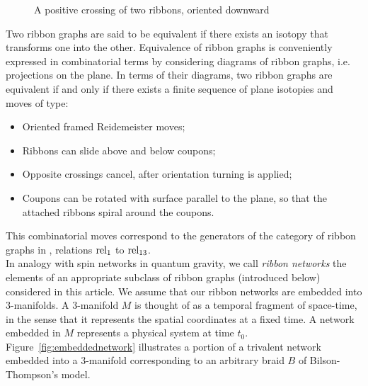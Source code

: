 \documentclass[aps,nofootinbib,amsfonts,superscriptaddress]{revtex4}
\begin{document}
\begin{figure}
    \centering
    \caption{A positive crossing of two ribbons, oriented downward}
    \label{fig:crossing}
\end{figure}
Two ribbon graphs are said to be equivalent if there exists an isotopy that transforms one into the other. Equivalence of ribbon graphs is conveniently expressed in combinatorial terms by considering diagrams of ribbon graphs, i.e. projections on the plane. In terms of their diagrams, two ribbon graphs are equivalent if and only if there exists a finite sequence of plane isotopies and moves of type:
\begin{itemize}
    \item 
    Oriented framed Reidemeister moves;
    \item 
    Ribbons can slide above and below coupons;
    \item
    Opposite crossings cancel, after orientation turning is applied;
    \item
    Coupons can be rotated with surface parallel to the plane, so that the attached ribbons spiral around the coupons.
\end{itemize}
This combinatorial moves correspond to the generators of the category of ribbon graphs in \cite{RT}, relations ${\rm rel}_1$ to ${\rm rel}_{13}$. \\

In analogy with spin networks in quantum gravity, we call {\it ribbon networks} the elements of an appropriate subclass of ribbon graphs (introduced below) considered in this article. We assume that our ribbon networks are embedded into $3$-manifolds. A $3$-manifold $M$ is thought of as a temporal fragment of space-time, in the sense that it represents the spatial coordinates at a fixed time. A network embedded in $M$ represents a physical system at time $t_0$. Figure~\ref{fig:embeddednetwork} illustrates a portion of a trivalent network embedded into a $3$-manifold corresponding to an arbitrary braid $B$ of Bilson-Thompson's model.\\ 
\end{document}
